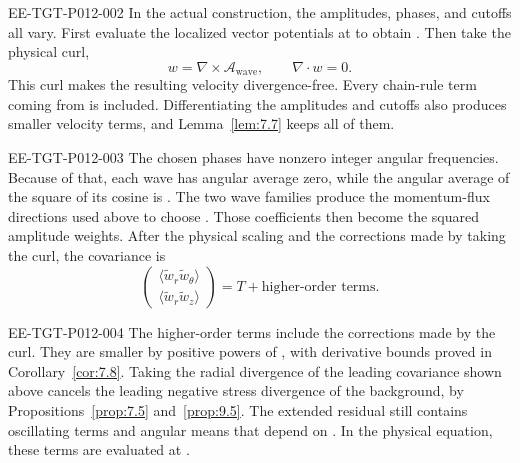\begin{EESegment}{EE-TGT-P012-002}
In the actual construction, the amplitudes, phases, and cutoffs all vary. First evaluate the
localized vector potentials at  to obtain
. Then take the physical curl,
\[
 w=\nabla\times\mathcal A_{\mathrm{wave}},\qquad \nabla\cdot w=0.
\]
This curl makes the resulting velocity divergence-free. Every chain-rule term coming from
 is included. Differentiating the amplitudes and cutoffs also produces
smaller velocity terms, and Lemma~\ref{lem:7.7} keeps all of them.
\end{EESegment}

\begin{EESegment}{EE-TGT-P012-003}
The chosen phases have nonzero integer angular frequencies. Because of that, each wave has angular
average zero, while the angular average of the square of its cosine is
. The two wave families produce the momentum-flux directions used above
to choose . Those coefficients then become the squared amplitude
weights. After the physical scaling and the corrections made by taking the curl, the covariance is
\[
 \begin{pmatrix}
  \langle\widetilde w_r\widetilde w_\theta\rangle\\
  \langle\widetilde w_r\widetilde w_z\rangle
 \end{pmatrix}
 =T+\text{higher-order terms}.
\]
\end{EESegment}

\begin{EESegment}{EE-TGT-P012-004}
The higher-order terms include the corrections made by the curl. They are smaller by positive
powers of , with derivative bounds proved in
Corollary~\ref{cor:7.8}. Taking the radial divergence of the leading covariance shown above
cancels the leading negative stress divergence of the background, by
Propositions~\ref{prop:7.5} and~\ref{prop:9.5}. The extended residual still contains oscillating
terms and angular means that depend on . In the physical equation, these
terms are evaluated at .
\end{EESegment}

